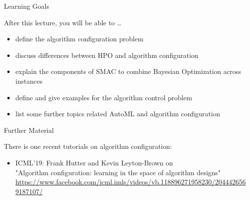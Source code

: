 \begin{frame}[c]{Learning Goals}

After this lecture, you will be able to \ldots

\begin{itemize}
	\item define the \alert{algorithm configuration problem}
	\item discuss \alert{differences} between HPO and algorithm configuration
	\item explain the \alert{components of SMAC} to combine Bayesian Optimization across instances
	\item define and give examples for the \alert{algorithm control problem}
	\item list some \alert{further topics} related AutoML and algorithm configuration
\end{itemize}

\end{frame}
\begin{frame}[c]{Further Material}

There is one recent tutorials on algorithm configuration:

\begin{itemize}
	\item ICML'19: Frank Hutter and Kevin Leyton-Brown on\\
	"Algorithm configuration: learning in the space of algorithm designs"\\
	\footnotesize{\url{https://www.facebook.com/icml.imls/videos/vb.118896271958230/2044426569187107/}}
\end{itemize}


\end{frame}
